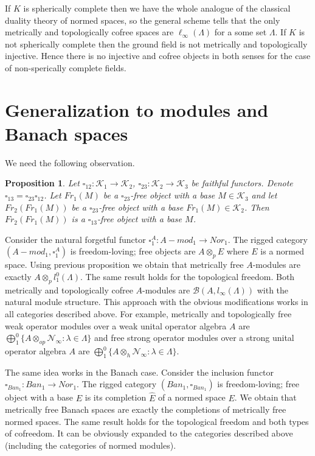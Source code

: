 \documentclass[a0b,landscape]{a0poster}
\newtheorem*{proposition}{Proposition}
\begin{document}
\begin{multicols}{4}
If $K$ is spherically complete then we have the whole analogue of the classical
duality theory of normed spaces, so the general scheme tells that the only
metrically and topologically cofree spaces are $\ell_\infty(\Lambda)$ for a some
set $\Lambda$. If $K$ is not spherically complete then the ground field is not
metrically and topologically injective. Hence there is no injective and cofree
objects in both senses for the case of non-sperically complete fields.






\section*{Generalization to modules and Banach spaces}


We need the following observation.

\begin{proposition}Let $\square_{12}:\mathcal{K}_1\to\mathcal{K}_2$,
$\square_{23}:\mathcal{K}_2\to\mathcal{K}_3$ be faithful functors. Denote
$\square_{13}=\square_{23}\square_{12}$. Let $Fr_1(M)$ be a $\square_{23}$-free
object with a base $M \in \mathcal{K}_3$ and let $Fr_2(Fr_1(M))$ be a
$\square_{23}$-free object with a base $Fr_1(M) \in \mathcal{K}_2$. Then
$Fr_2(Fr_1(M))$ is a $\square_{13}$-free object with a base $M$.
\end{proposition}

Consider the natural forgetful functor $\square^{A}_{1}:A-mod_1\to Nor_1$. The
rigged category $(A-mod_1, \square^{A}_{1})$ is freedom-loving; free objects are
$A \otimes_p E$ where $E$ is a normed space. Using previous proposition we
obtain that metrically free $A$-modules are exactly $A \otimes_p
l_1^0(\Lambda)$. The same result holds for the topological freedom. Both
metrically and topologically cofree $A$-modules are $\mathcal{B}(A,
l_{\infty}(\Lambda))$ with the natural module structure. This approach with the
obvious modifications works in all categories described above. For example,
metrically and topologically free weak operator modules over a weak unital
operator algebra $A$ are $\bigoplus_1^0\{A \otimes_{op} \mathcal{N}_\infty:
\lambda \in \Lambda \}$ and free strong operator modules over a strong unital
operator algebra $A$ are $\bigoplus_1^0\{A \otimes_{h} \mathcal{N}_\infty:
\lambda \in \Lambda \}$.

The same idea works in the Banach case. Consider the inclusion functor
$\square_{Ban_1}: Ban_1\to Nor_1$. The rigged category $(Ban_1,
\square_{Ban_1})$ is freedom-loving; free object with a base $E$ is its
completion $\widehat{E}$ of a normed space $E$. We obtain that metrically free
Banach spaces are exactly the completions of metrically free normed spaces. The
same result holds for the topological freedom and both types of cofreedom. It
can be obviously expanded to the categories described above (including the
categories of normed modules).

\end{multicols}
\end{document}
